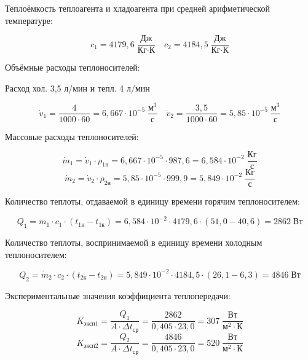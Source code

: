 \documentclass[12pt, a4paper]{article}
\begin{document}
\begin{flushleft}
Теплоёмкость теплоагента и хладоагента при средней арифметической температуре:
\end{flushleft}
$$c_{1} = 4179,6 \; \frac{\textrm{Дж}}{\textrm{Кг}  \cdot \textrm{К}} \quad c_{2} = 4184,5 \; \frac{\textrm{Дж}}{\textrm{Кг}  \cdot \textrm{К}}$$

\begin{flushleft}
Объёмные расходы теплоносителей:
 \end{flushleft}
\begin{center}
Расход хол. 3,5 л/мин и тепл. 4 л/мин 
\end{center}
$$\dot{v}_{1} = \frac{4 }{1000 \cdot 60} = 6,667 \cdot 10^{-5} \; \frac{\textrm{м}^3}{\textrm{с}} \quad \dot{v}_{2} = \frac{3,5 }{1000 \cdot 60} = 5,85 \cdot 10^{-5} \; \frac{\textrm{м}^3}{\textrm{с}}$$ 

\begin{flushleft}
Массовые расходы теплоносителей:
\end{flushleft}
$$\dot{m}_{1} = \dot{v}_{1} \cdot \rho_{\textrm{1н}} =  6,667 \cdot 10^{-5} \cdot 987,6 = 6,584 \cdot 10^{-2} \; \frac{\textrm{Кг}}{\textrm{с}}$$
$$\dot{m}_{2} = \dot{v}_{2} \cdot \rho_{\textrm{2н}} =  5,85 \cdot 10^{-5} \cdot 999,9 = 5,849 \cdot 10^{-2} \; \frac{\textrm{Кг}}{\textrm{с}}$$

\begin{flushleft}
Количество теплоты, отдаваемой в единицу времени горячим теплоносителем:
\end{flushleft}
$$Q_{1} = \dot{m}_{1} \cdot c_{1} \cdot \left(t_{\textrm{1н}} - t_{\textrm{1к}} \right) = 6,584 \cdot 10^{-2} \cdot 4179,6 \cdot \left(51,0 - 40,6 \right) = 2862 \; \textrm{Вт}$$

\begin{flushleft}
Количество теплоты, воспринимаемой в единицу времени холодным теплоносителем:
\end{flushleft}
$$Q_{2} = \dot{m}_{2} \cdot c_{2} \cdot \left(t_{\textrm{2к}} - t_{\textrm{2н}} \right) = 5,849 \cdot 10^{-2} \cdot 4184,5 \cdot \left(26,1 - 6,3 \right) = 4846 \; \textrm{Вт}$$

\begin{flushleft}
Экспериментальные значения коэффициента теплопередачи:
\end{flushleft}
$$K_{\textrm{эксп1}} = \frac{Q_{1}}{A \cdot \Delta t_{\textrm{ср}}} = \frac{2862}{0,405 \cdot 23,0} = 307 \; \frac{\textrm{Вт}}{\textrm{м}^2 \cdot \textrm{К}}$$
$$K_{\textrm{эксп2}} = \frac{Q_{2}}{A \cdot \Delta t_{\textrm{ср}}} = \frac{4846}{0,405 \cdot 23,0} = 520 \; \frac{\textrm{Вт}}{\textrm{м}^2 \cdot \textrm{К}}$$
\end{document}

